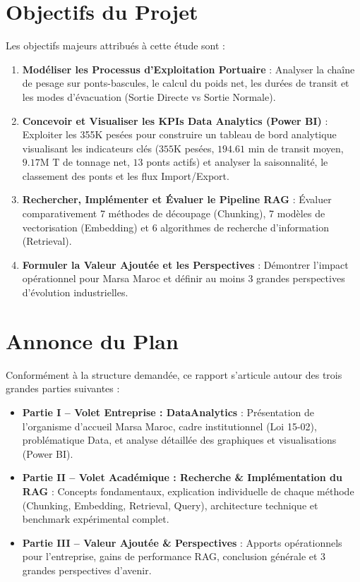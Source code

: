 \documentclass[12pt,a4paper,oneside]{report}
\begin{document}
\section*{Objectifs du Projet}
Les objectifs majeurs attribués à cette étude sont :
\begin{enumerate}
    \item \textbf{Modéliser les Processus d'Exploitation Portuaire} : Analyser la chaîne de pesage sur ponts-bascules, le calcul du poids net, les durées de transit et les modes d'évacuation (Sortie Directe vs Sortie Normale).
    \item \textbf{Concevoir et Visualiser les KPIs Data Analytics (Power BI)} : Exploiter les 355K pesées pour construire un tableau de bord analytique visualisant les indicateurs clés ($355\text{K}$ pesées, $194.61\text{ min}$ de transit moyen, $9.17\text{M T}$ de tonnage net, $13$ ponts actifs) et analyser la saisonnalité, le classement des ponts et les flux Import/Export.
    \item \textbf{Rechercher, Implémenter et Évaluer le Pipeline RAG} : Évaluer comparativement 7 méthodes de découpage (Chunking), 7 modèles de vectorisation (Embedding) et 6 algorithmes de recherche d'information (Retrieval).
    \item \textbf{Formuler la Valeur Ajoutée et les Perspectives} : Démontrer l'impact opérationnel pour Marsa Maroc et définir au moins 3 grandes perspectives d'évolution industrielles.
\end{enumerate}

\section*{Annonce du Plan}
Conformément à la structure demandée, ce rapport s'articule autour des trois grandes parties suivantes :
\begin{itemize}
    \item \textbf{Partie I – Volet Entreprise : DataAnalytics} : Présentation de l'organisme d'accueil Marsa Maroc, cadre institutionnel (Loi 15-02), problématique Data, et analyse détaillée des graphiques et visualisations (Power BI).
    \item \textbf{Partie II – Volet Académique : Recherche \& Implémentation du RAG} : Concepts fondamentaux, explication individuelle de chaque méthode (Chunking, Embedding, Retrieval, Query), architecture technique et benchmark expérimental complet.
    \item \textbf{Partie III – Valeur Ajoutée \& Perspectives} : Apports opérationnels pour l'entreprise, gains de performance RAG, conclusion générale et 3 grandes perspectives d'avenir.
\end{itemize}
\end{document}

